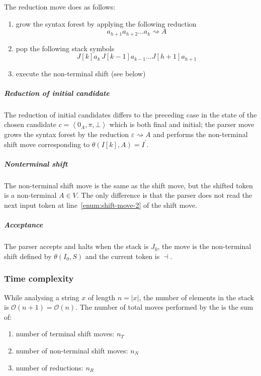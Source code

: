 \documentclass[english]{article}
\begin{document}
The reduction move does as follows:

\begin{enumerate}
  \item grow the syntax forest by applying the following reduction
        \[ a_{h+1} a_{h+2} \ldots a_k \rightsquigarrow A \]
  \item pop the following stack symbols
        \[ J[k] a_k \, J[k-1] a_{k-1} \ldots J[h+1] a_{h+1} \]
  \item execute the non-terminal shift (see below)
\end{enumerate}

\subparagraph*{Reduction of initial candidate}

The reduction of initial candidates differs to the preceding case in the state of the chosen candidate \(c = \left\langle 0_A, \pi, \bot \right\rangle\) which is both final and initial;
the parser move grows the syntax forest by the reduction \(\varepsilon \rightsquigarrow A\) and performs the non-terminal shift move corresponding to \(\theta(I[k], A) = I^\prime\).

\subparagraph*{Nonterminal shift}

The non-terminal shift move is the same as the shift move, but the shifted token is a non-terminal \(A \in V\).
The only difference is that the parser does not read the next input token at line~\ref{enum:shift-move-2} of the shift move.

\subparagraph*{Acceptance}

The parser accepts and halts when the stack is \(J_0\), the move is the non-terminal shift defined by \(\theta(I_0, S)\) and the current token is \(\dashv\).

\subsubsection{Time complexity}

While analysing a string \(x\) of length \(n = |x|\), the number of elements in the stack is \(\mathcal{O}(n+1)=\mathcal{O}(n)\).
The number of total moves performed by the \PDA is the sum of:

\begin{enumerate}
  \item number of terminal shift moves: \(n_T\)
  \item number of non-terminal shift moves: \(n_N\)
  \item number of reductions: \(n_R\)
\end{enumerate}
\end{document}
